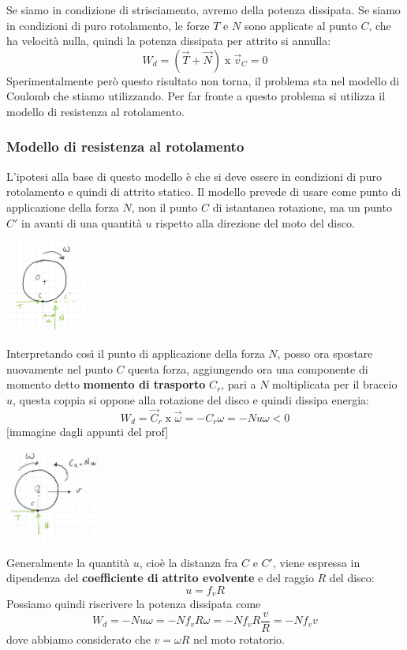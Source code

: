 \newline
Se siamo in condizione di strisciamento, avremo della potenza dissipata.\newline
Se siamo in condizioni di puro rotolamento, le forze $T$ e $N$ sono applicate al punto $C$, che ha velocità nulla, quindi la potenza dissipata per attrito si annulla:
\[
    W_d = (\vec{T} + \vec{N}) \;\text{x}\; \vec{v}_C = 0
\]
Sperimentalmente però questo risultato non torna, il problema sta nel modello di Coulomb che stiamo utilizzando. Per far fronte a questo problema si utilizza il modello di resistenza al rotolamento.
\subsubsection*{Modello di resistenza al rotolamento}
L'ipotesi alla base di questo modello è che si deve essere in condizioni di puro rotolamento e quindi di attrito statico. Il modello prevede di usare come punto di applicazione della forza $N$, non il punto $C$ di istantanea rotazione, ma un punto $C'$ in avanti di una quantità $u$ rispetto alla direzione del moto del disco.
\begin{center}
    \includegraphics[height=3cm]{../lezione11/img10.JPG}
\end{center}
Interpretando così il punto di applicazione della forza $N$, posso ora spostare nuovamente nel punto $C$ questa forza, aggiungendo ora una componente di momento detto \textbf{momento di trasporto} $C_r$, pari a $N$ moltiplicata per il braccio $u$, questa coppia si oppone alla rotazione del disco e quindi dissipa energia:
\[
    W_d = \vec{C}_r \;\text{x}\; \vec{\omega} = -C_r \omega = - N u \omega < 0
\]
[immagine dagli appunti del prof]
\begin{center}
    \includegraphics[height=3cm]{../lezione11/img11.JPG }
\end{center}
Generalmente la quantità $u$, cioè la distanza fra $C$ e $C'$, viene espressa in dipendenza del \textbf{coefficiente di attrito evolvente} e del raggio $R$ del disco:
\[
    u = f_v R
\]
Possiamo quindi riscrivere la potenza dissipata come
\[
    W_d = - N u \omega = - N f_v R \omega = - N f_v R \frac{v}{R} = - N f_v v
\]
dove abbiamo considerato che $v = \omega R$ nel moto rotatorio.
